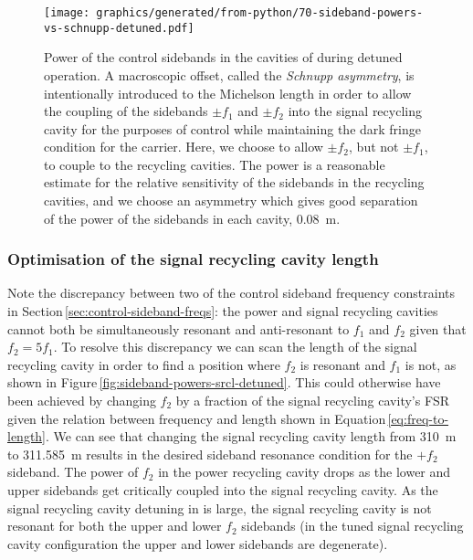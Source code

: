 \begin{figure}
  \centering
  \texttt{[image: graphics/generated/from-python/70-sideband-powers-vs-schnupp-detuned.pdf]}
  \caption[Power of the control sidebands in the cavities of \ETLF{} in the detuned configuration]{\label{fig:sideband-powers-vs-schnupp-detuned}Power of the control sidebands in the cavities of \ETLF{} during detuned operation. A macroscopic offset, called the \emph{Schnupp asymmetry}, is intentionally introduced to the Michelson length in order to allow the coupling of the sidebands $\pm f_1$ and $\pm f_2$ into the signal recycling cavity for the purposes of control while maintaining the dark fringe condition for the carrier. Here, we choose to allow $\pm f_2$, but not $\pm f_1$, to couple to the recycling cavities. The power is a reasonable estimate for the relative sensitivity of the sidebands in the recycling cavities, and we choose an asymmetry which gives good separation of the power of the sidebands in each cavity, \SI{0.08}{\meter}.}
\end{figure}

\subsubsection{Optimisation of the signal recycling cavity length}
Note the discrepancy between two of the control sideband frequency constraints in Section\,\ref{sec:control-sideband-freqs}: the power and signal recycling cavities cannot both be simultaneously resonant and anti-resonant to $f_1$ and $f_2$ given that $f_2 = 5 f_1$. To resolve this discrepancy we can scan the length of the signal recycling cavity in order to find a position where $f_2$ is resonant and $f_1$ is not, as shown in Figure\,\ref{fig:sideband-powers-srcl-detuned}. This could otherwise have been achieved by changing $f_2$ by a fraction of the signal recycling cavity's \gls{FSR} given the relation between frequency and length shown in Equation\,\ref{eq:freq-to-length}. We can see that changing the signal recycling cavity length from \SI{310}{\meter} to \SI{311.585}{\meter} results in the desired sideband resonance condition for the $+f_2$ sideband. The power of $f_2$ in the power recycling cavity drops as the lower and upper sidebands get critically coupled into the signal recycling cavity. As the signal recycling cavity detuning in \ETLF{} is large, the signal recycling cavity is not resonant for both the upper and lower $f_2$ sidebands (in the tuned signal recycling cavity configuration the upper and lower sidebands are degenerate).


